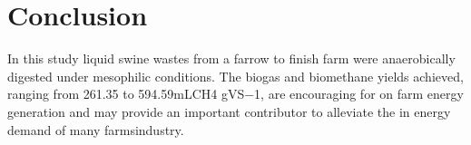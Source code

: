 \section{Conclusion}
In this study liquid swine wastes from a farrow to finish farm were anaerobically digested under mesophilic conditions. The biogas and biomethane yields achieved, ranging from 261.35 to 594.59mLCH4 gVS−1, are encouraging for on farm energy generation and may provide an important contributor to alleviate the in energy demand of many farmsindustry.